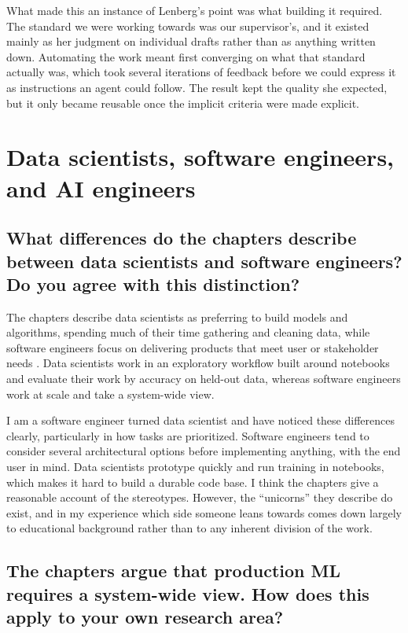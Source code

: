 \documentclass{article}
\begin{document}
What made this an instance of Lenberg's point was what building it required. The standard we were working towards was our supervisor's, and it existed mainly as her judgment on individual drafts rather than as anything written down. Automating the work meant first converging on what that standard actually was, which took several iterations of feedback before we could express it as instructions an agent could follow. The result kept the quality she expected, but it only became reusable once the implicit criteria were made explicit.

\section{Data scientists, software engineers, and AI engineers}

\subsection*{What differences do the chapters describe between data scientists and software engineers? Do you agree with this distinction?}

The chapters describe data scientists as preferring to build models and algorithms, spending much of their time gathering and cleaning data, while software engineers focus on delivering products that meet user or stakeholder needs \cite{kastner2024mlip}. Data scientists work in an exploratory workflow built around notebooks and evaluate their work by accuracy on held-out data, whereas software engineers work at scale and take a system-wide view.

I am a software engineer turned data scientist and have noticed these differences clearly, particularly in how tasks are prioritized. Software engineers tend to consider several architectural options before implementing anything, with the end user in mind. Data scientists prototype quickly and run training in notebooks, which makes it hard to build a durable code base. I think the chapters give a reasonable account of the stereotypes. However, the ``unicorns'' they describe do exist, and in my experience which side someone leans towards comes down largely to educational background rather than to any inherent division of the work.

\subsection*{The chapters argue that production ML requires a system-wide view. How does this apply to your own research area?}
\end{document}
